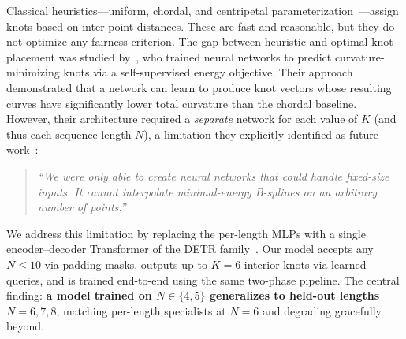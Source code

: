 \documentclass[11pt, a4paper]{article}
\begin{document}
Classical heuristics---uniform, chordal, and centripetal
parameterization~\cite{Lee1989}---assign knots based on inter-point
distances. These are fast and reasonable, but they do not optimize any
fairness criterion. The gap between heuristic and optimal knot placement was
studied by~\cite{Chhetri2024}, who trained neural networks to predict
curvature-minimizing knots via a self-supervised energy objective. Their
approach demonstrated that a network can learn to produce knot vectors whose
resulting curves have significantly lower total curvature than the chordal
baseline. However, their architecture required a \emph{separate} network for
each value of $K$ (and thus each sequence length $N$), a limitation they
explicitly identified as future work~\cite[§7.3]{Chhetri2024}:

\begin{quote}
\emph{``We were only able to create neural networks that could handle
fixed-size inputs. It cannot interpolate minimal-energy B-splines on
an arbitrary number of points.''}
\end{quote}

We address this limitation by replacing the per-length MLPs with a single
encoder--decoder Transformer of the DETR family~\cite{Carion2020}. Our
model accepts any $N \leq 10$ via padding masks, outputs up to $K = 6$
interior knots via learned queries, and is trained end-to-end using the same
two-phase pipeline. The central finding: \textbf{a model trained on
$N \in \{4,5\}$ generalizes to held-out lengths $N = 6, 7, 8$}, matching
per-length specialists at $N = 6$ and degrading gracefully beyond.
\end{document}
